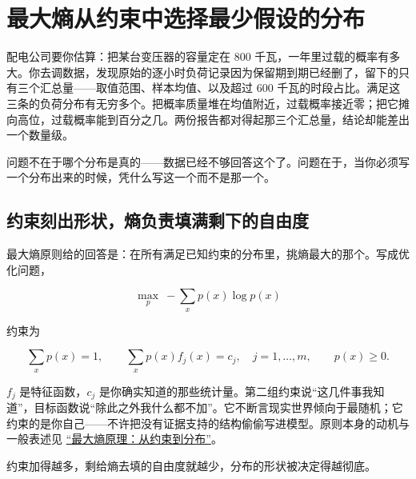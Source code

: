 \section{最大熵从约束中选择最少假设的分布}
\label{sec:13-Machine-Learning/11-Information-Theoretic-Learning/02}

配电公司要你估算：把某台变压器的容量定在 800 千瓦，一年里过载的概率有多大。你去调数据，发现原始的逐小时负荷记录因为保留期到期已经删了，留下的只有三个汇总量——取值范围、样本均值、以及超过 600 千瓦的时段占比。满足这三条的负荷分布有无穷多个。把概率质量堆在均值附近，过载概率接近零；把它摊向高位，过载概率能到百分之几。两份报告都对得起那三个汇总量，结论却能差出一个数量级。

问题不在于哪个分布是真的——数据已经不够回答这个了。问题在于，当你必须写一个分布出来的时候，凭什么写这一个而不是那一个。

\subsection{约束刻出形状，熵负责填满剩下的自由度}

最大熵原则给的回答是：在所有满足已知约束的分布里，挑熵最大的那个。写成优化问题，

\[
\max_p\ -\sum_x p(x)\log p(x)
\]

约束为

\[
\sum_x p(x)=1,\qquad \sum_x p(x)f_j(x)=c_j,\quad j=1,\ldots,m,\qquad p(x)\ge 0.
\]

\(f_j\) 是特征函数，\(c_j\) 是你确实知道的那些统计量。第二组约束说``这几件事我知道''，目标函数说``除此之外我什么都不加''。它不断言现实世界倾向于最随机；它约束的是你自己——不许把没有证据支持的结构偷偷写进模型。原则本身的动机与一般表述见 \hyperref[sec:07-Information-Theory/01-Information-and-Entropy/04]{``最大熵原理：从约束到分布''}。

约束加得越多，剩给熵去填的自由度就越少，分布的形状被决定得越彻底。

